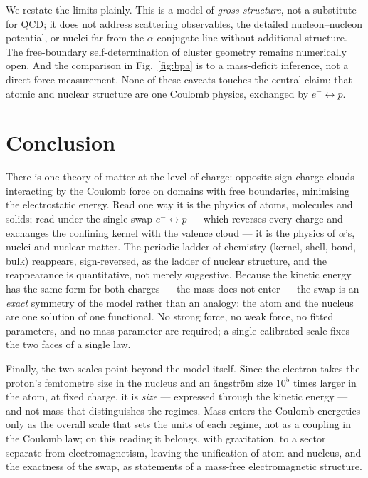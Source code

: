 \documentclass[11pt]{article}
\begin{document}
We restate the limits plainly. This is a model of \emph{gross structure}, not a substitute for QCD; it
does not address scattering observables, the detailed nucleon--nucleon potential, or nuclei far from
the $\alpha$-conjugate line without additional structure. The free-boundary self-determination of
cluster geometry remains numerically open. And the comparison in Fig.~\ref{fig:bpa} is to a
mass-deficit inference, not a direct force measurement. None of these caveats touches the central
claim: that atomic and nuclear structure are one Coulomb physics, exchanged by $e^-\!\leftrightarrow
p$.

\section{Conclusion}

There is one theory of matter at the level of charge: opposite-sign charge clouds interacting by the
Coulomb force on domains with free boundaries, minimising the electrostatic energy. Read one way it is
the physics of atoms, molecules and solids; read under the single swap $e^-\!\leftrightarrow p$ --- which
reverses every charge and exchanges the confining kernel with the valence cloud --- it is the physics of
$\alpha$'s, nuclei and nuclear matter. The periodic ladder of chemistry (kernel, shell, bond, bulk)
reappears, sign-reversed, as the ladder of nuclear structure, and the reappearance is quantitative, not
merely suggestive. Because the kinetic energy has the same form for both charges --- the mass does not
enter --- the swap is an \emph{exact} symmetry of the model rather than an analogy: the atom and the
nucleus are one solution of one functional. No strong force, no weak force, no fitted parameters, and no
mass parameter are required; a single calibrated scale fixes the two faces of a single law.

Finally, the two scales point beyond the model itself. Since the electron takes the proton's
femtometre size in the nucleus and an {\aa}ngstr\"om size $10^5$ times larger in the atom, at fixed
charge, it is \emph{size} --- expressed through the kinetic energy --- and not mass that distinguishes
the regimes. Mass enters the Coulomb energetics only as the overall scale that sets the units of each
regime, not as a coupling in the Coulomb law; on this reading it belongs, with gravitation, to a
sector separate from electromagnetism, leaving the unification of atom and nucleus, and the exactness
of the swap, as statements of a mass-free electromagnetic structure.
\end{document}
